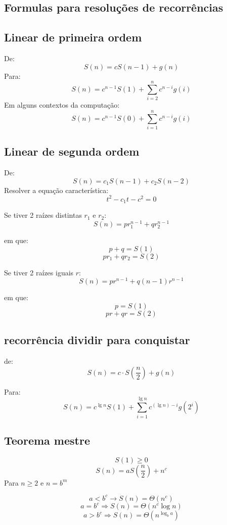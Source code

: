\begin{tcolorbox}[sharp corners, colback=white,boxrule=1mm]
\section{Formulas para resoluções de recorrências}
\subsection{Linear de primeira ordem}
De:
\[S(n) = cS(n-1) + g(n)\]
Para:
\[S(n) = c^{n-1}S(1) + \sum_{i=2}^{n}c^{n-i}g(i)\]
Em alguns contextos da computação:
\[S(n) = c^{n-1}S(0) + \sum_{i=1}^{n}c^{n-i}g(i)\]

\subsection{Linear de segunda ordem}
De:
\[S(n) = c_1S(n-1) + c_2S(n-2)\]
Resolver a equação característica:
\[t^2 - c_1t - c^2 = 0\]

Se tiver 2 raízes distintas $r_1$ e $r_2$:
\[S(n) = pr_1^{n-1} + qr_2^{n-1}\]

em que:
\[p + q = S(1)\]
\[pr_1 + qr_2 = S(2)\]

Se tiver 2 raízes iguais \(r\):
\[S(n) = pr^{n-1} + q(n-1)r^{n-1}\]

em que:
\[p = S(1)\]
\[pr + qr = S(2)\]

\subsection{recorrência dividir para conquistar}
de:
\[S(n) = c\cdot S\left ( \frac n2 \right ) + g(n)\]

Para:
\[S(n) = c^{\lg n}S(1) + \sum_{i=1}^{\lg n}c^{(\lg n) - i}g(2^i)\]

\subsection{Teorema mestre}
\[S(1) \geq 0\]
\[S(n) = aS\left(\frac{n}{2}\right) + n^c\]
Para \(n \geq 2\) e \(n = b^m\)

\[a < b^c \rightarrow S(n) = \Theta(n^c)\]
\[a = b^c \Rightarrow S(n) = \Theta(n^c \log n)\]
\[a > b^c \Rightarrow S(n) = \Theta(n^{\log_b a})\]
\end{tcolorbox}